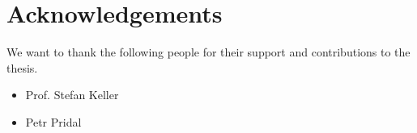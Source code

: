 

\bigskip


\begingroup

\let\clearpage\relax
\let\cleardoublepage\relax
\let\cleardoublepage\relax

\chapter*{Acknowledgements} %

We want to thank the following people for their support and contributions to the thesis.

\begin{itemize}
\item
  Prof. Stefan Keller
\item
  Petr Pridal
\end{itemize}

\endgroup
